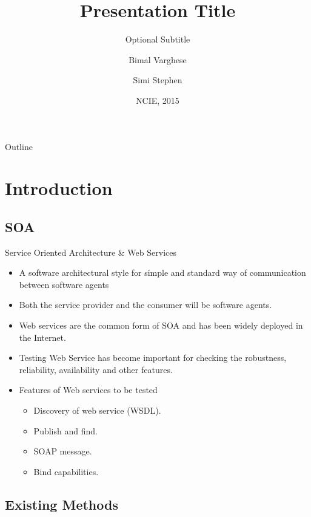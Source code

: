 \documentclass{beamer}
\title{Presentation Title}
\subtitle{Optional Subtitle}
\author{Bimal Varghese\inst{1} \and Simi Stephen \inst{2}}
\institute[FISAT] %
{
  \inst{1}%
  Department of Computer Science and Engineering\\
  FISAT \\
  Angamaly
  \and
  \inst{2}%
  Department of Computer Science and Engineering\\
  FISAT \\
  Angamaly
  }
\date{NCIE, 2015}
\begin{document}
\begin{frame}
  \titlepage
\end{frame}

\begin{frame}{Outline}
  \tableofcontents
\end{frame}

\section{Introduction}

\subsection{SOA}

\begin{frame}{Service Oriented Architecture \& Web Services}
  \begin{itemize}
  \item A software architectural style for  simple and standard way of communication between software agents
  \item Both the service provider and the consumer will be software agents.
  \item Web services are the common form of SOA and has been widely deployed in the
  Internet.
  \item Testing Web Service has become important for checking the robustness, reliability, availability and other features.
  \item Features of Web services to be tested
  \begin{itemize}
  	\item Discovery of web service (WSDL).
  	\item Publish and find.
  	\item SOAP message.
  	\item Bind capabilities.
  \end{itemize}
\end{itemize}
\end{frame}

\subsection{Existing Methods}
\end{document}
